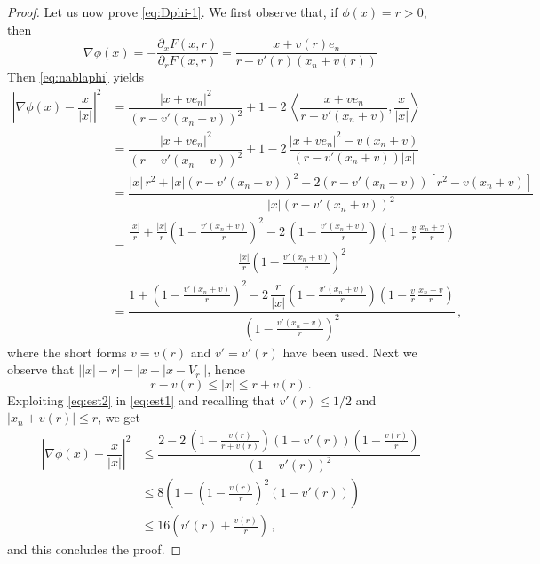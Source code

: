 \documentclass[a4paper,reqno,11pt]{amsart}
\newcommand{\de}{\partial}
\begin{document}
\begin{proof}
Let us now prove \eqref{eq:Dphi-1}. We first observe that, if $\phi(x) = r > 0$, then
\begin{equation} \label{eq:nablaphi}
\nabla \phi (x) = - \dfrac{\de_{x} F (x,r)}{\de_{r} F (x,r)} = \dfrac{x + v(r) e_{n}}{r - v'(r)(x_{n} + v(r))}
\end{equation}
Then \eqref{eq:nablaphi} yields
\begin{align} \label{eq:est1}
\left| \nabla \phi(x) - \dfrac{x}{|x|} \right|^{2} & = \dfrac{|x + v e_{n}|^{2}}{(r - v'(x_{n} + v))^{2}} + 1 - 2 \, \left \langle \dfrac{x + v e_{n}}{r - v'(x_{n} + v)} , \dfrac{x}{|x|} \right \rangle \nonumber \\
& = \dfrac{|x + v e_{n}|^{2}}{(r - v'(x_{n} + v))^{2}} + 1 - 2 \, \dfrac{|x + v e_{n}|^{2} - v(x_{n} + v)}{(r - v'(x_{n} + v))|x|} \nonumber \\
& = \dfrac{|x| \, r^{2} + |x|(r - v'(x_{n} + v))^{2} - 2(r - v'(x_{n} + v))[r^{2} - v(x_{n} + v)]}{|x|(r - v'(x_{n} + v))^{2}} \nonumber\\
& = \dfrac{\frac{|x|}{r} + \frac{|x|}{r} \left( 1 - \frac{v'(x_{n} + v)}{r} \right)^{2} - 2 \, \left( 1 - \frac{v'(x_{n} + v)}{r} \right) \left( 1 - \frac{v}{r} \, \frac{x_{n} + v}{r} \right)}{\frac{|x|}{r} \left( 1 - \frac{v'(x_{n} + v)}{r} \right)^{2} } \nonumber \\
& = \dfrac{1 +  \left( 1 - \frac{v'(x_{n} + v)}{r} \right)^{2} - 2 \, \dfrac{r}{|x|} \left( 1 - \frac{v'(x_{n} + v)}{r} \right) \left( 1 - \frac{v}{r} \, \frac{x_{n} + v}{r} \right)}{\left( 1 - \frac{v'(x_{n} + v)}{r} \right)^{2} } \, , 
\end{align}
where the short forms $v=v(r)$ and $v'=v'(r)$ have been used.
Next we observe that $\big||x| - r\big| = \big|x - |x - V_r|\big|$, hence
\begin{equation}\label{eq:est2}
r-v(r)\le |x| \le r+ v(r)\,.
\end{equation}
Exploiting \eqref{eq:est2} in \eqref{eq:est1} and recalling that $v'(r) \le 1/2$ and $|x_{n}+v(r)|\le r$, we get
\begin{align*}
\left| \nabla \phi(x) - \dfrac{x}{|x|} \right|^{2} &\leq \dfrac{ 2 - 2 \, \left( 1 - \frac{v(r)}{r+v(r)} \right) ( 1 - v'(r)) \left( 1 - \frac{v(r)}{r}\right)}{(1 - v'(r))^{2} }\\
&\le 8\left(1-\left(1-\frac{v(r)}{r}\right)^{2}(1-v'(r))\right)\\
&\le 16\left(v'(r) + \frac{v(r)}{r}\right)\,,
\end{align*}
and this concludes the proof.
\end{proof}
\end{document}
